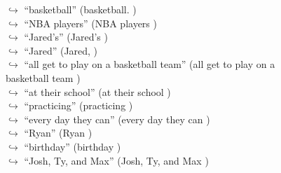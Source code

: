 \documentclass[11pt,a4paper, onecolumn]{article}
\begin{document}
\begin{figure}[t] \small \begin{tcolorbox}[boxsep=0pt,left=5pt,right=0pt,top=2pt,colback = yellow!5] \begin{dialogue}
 \small 
\colorbox{pink!25}{$\hookrightarrow$}
{ ``basketball'' (basketball. ) }
\\
\colorbox{pink!25}{$\hookrightarrow$}
{ ``NBA players'' (NBA players ) }
\\
\colorbox{pink!25}{$\hookrightarrow$}
{ ``Jared's'' (Jared's ) }
\\
\colorbox{pink!25}{$\hookrightarrow$}
{ ``Jared'' (Jared, ) }
\\
\colorbox{pink!25}{$\hookrightarrow$}
{ ``all get to play on a basketball team'' (all get to play on a basketball team ) }
\\
\colorbox{pink!25}{$\hookrightarrow$}
{ ``at their school'' (at their school ) }
\\
\colorbox{pink!25}{$\hookrightarrow$}
{ ``practicing'' (practicing ) }
\\
\colorbox{pink!25}{$\hookrightarrow$}
{ ``every day they can'' (every day they can ) }
\\
\colorbox{pink!25}{$\hookrightarrow$}
{ ``Ryan'' (Ryan ) }
\\
\colorbox{pink!25}{$\hookrightarrow$}
{ ``birthday'' (birthday ) }
\\
\colorbox{pink!25}{$\hookrightarrow$}
{ ``Josh, Ty, and Max'' (Josh, Ty, and Max ) }
\\
 \end{dialogue}\end{tcolorbox}\end{figure}
\end{document}
